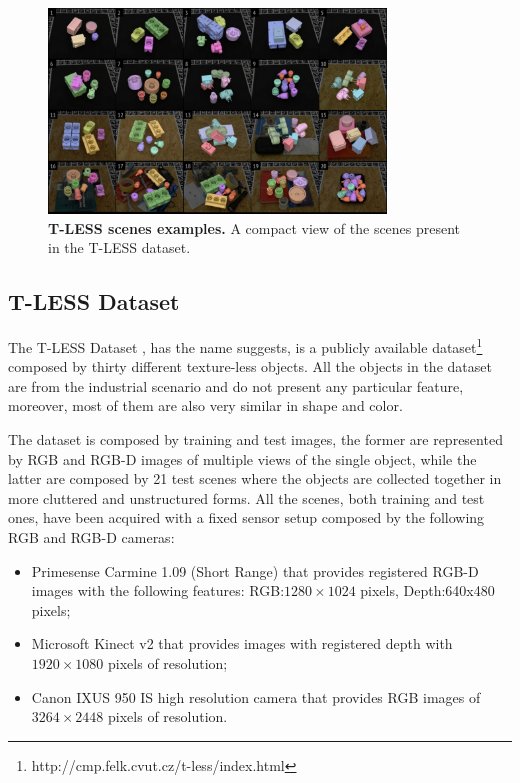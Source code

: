 \begin{figure}
    \centering
    \includegraphics[width=0.8\textwidth]{figures/2_benchmarks_and_metrics/tless_ex_scenes}
    \caption{\textbf{T-LESS scenes examples.} A compact view of the scenes present in the T-LESS dataset.}
    \label{fig:tless_ex_scene}
\end{figure}

\subsection{T-LESS Dataset}\label{subsec:tless_dataset}
The T-LESS Dataset \cite{hodan2017tless}, has the name suggests, is a publicly available dataset\footnote{http://cmp.felk.cvut.cz/t-less/index.html} composed by thirty different texture-less objects. All the objects in the dataset are from the industrial scenario and do not present any particular feature, moreover, most of them are also very similar in shape and color.

The dataset is composed by training and test images, the former are represented by RGB and RGB-D images of multiple views of the single object, while the latter are composed by 21 test scenes where the objects are collected together in more cluttered and unstructured forms. All the scenes, both training and test ones, have been acquired with a fixed sensor setup composed by the following RGB and RGB-D cameras:

\begin{itemize}
	\item Primesense Carmine 1.09 (Short Range) that provides registered RGB-D images with the following features: RGB:$1280\times1024$ pixels, Depth:640x480 pixels;
	\item Microsoft Kinect v2 that provides images with registered depth with $1920\times1080$ pixels of resolution;
	\item Canon IXUS 950 IS high resolution camera that provides RGB images of $3264\times2448$ pixels of resolution.
\end{itemize}


